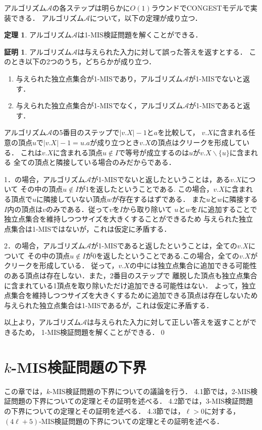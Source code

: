 \documentclass[12pt]{thesis}
\newcommand{\CONGEST}{\textsf{CONGEST}}
\theoremstyle{definition}
\newtheorem{theorem}{定理}[chapter]
\newtheorem*{prf*}{証明}
\begin{document}
アルゴリズム$\mathcal{A}$の各ステップは明らかに$O(1)$ラウンドで{\CONGEST}モデルで実装できる．
アルゴリズム$\mathcal{A}$について，以下の定理が成り立つ．
\begin{theorem}
アルゴリズム$\mathcal{A}$は1-MIS検証問題を解くことができる．
\end{theorem}
\begin{prf*}
アルゴリズム$\mathcal{A}$は与えられた入力に対して誤った答えを返すとする．
このとき以下の2つのうち，どちらかが成り立つ． 
\begin{enumerate}
\item 与えられた独立点集合が1-MISであり，アルゴリズム$\mathcal{A}$が1-MISでないと返す． 
\item 与えられた独立点集合が1-MISでなく，アルゴリズム$\mathcal{A}$が1-MISであると返す． 
\end{enumerate}
アルゴリズム$\mathcal{A}$の5番目のステップで$|v.X| - 1$と$a$を比較して，
$v.X$に含まれる任意の頂点$u$で$|v.X| - 1 = u.a$が成り立つとき$v.X$の頂点はクリークを形成している．
これは$v.X$に含まれる頂点$u \notin I$で等号が成立するのは$u$が$v.X \backslash \{u\}$に含まれる
全ての頂点と隣接している場合のみだからである．

1．の場合，アルゴリズム$\mathcal{A}$が1-MISでないと返したということは，ある$v.X$について
その中の頂点$u \notin I$が1を返したということである.
この場合，$v.X$に含まれる頂点で$u$に隣接していない頂点$w$が存在するはずである．
また$u$と$w$に隣接する$I$内の頂点は$v$のみである．従って$v$を$I$から取り除いて
$u$と$w$を$I$に追加することで独立点集合を維持しつつサイズを大きくすることができるため
与えられた独立点集合は1-MISではないが，これは仮定に矛盾する． 

2．の場合，アルゴリズム$\mathcal{A}$が1-MISであると返したということは，全ての$v.X$について
その中の頂点$u \notin I$が0を返したということである.この場合，全ての$v.X$がクリークを形成している．
従って，$v.X$の中には独立点集合に追加できる可能性のある頂点は存在しない．また，2番目のステップで
離脱した頂点も独立点集合に含まれている1頂点を取り除いただけ追加できる可能性はない．
よって，独立点集合を維持しつつサイズを大きくするために追加できる頂点は存在しないため
与えられた独立点集合は1-MISであるが，これは仮定に矛盾する． 

以上より，アルゴリズム$\mathcal{A}$は与えられた入力に対して正しい答えを返すことができるため，
1-MIS検証問題を解くことができる．\qed
\end{prf*}
\newpage

\chapter{$k$-MIS検証問題の下界}
この章では，$k$-MIS検証問題の下界についての議論を行う．
4.1節では，2-MIS検証問題の下界についての定理とその証明を述べる．
4.2節では，3-MIS検証問題の下界についての定理とその証明を述べる．
4.3節では，$\ell > 0$に対する，$(4\ell + 5)$-MIS検証問題の下界についての定理とその証明を述べる．
\end{document}
